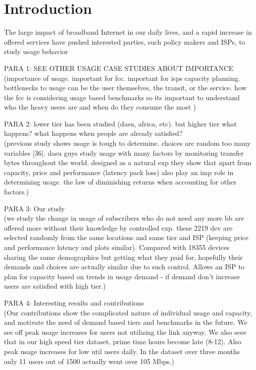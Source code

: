 \section{Introduction}\label{sec:introduction}

The large impact of broadband Internet in our daily lives, and a rapid increase 
in offered services have pushed interested parties, such policy makers and 
ISPs, to study usage behavior



PARA 1: SEE OTHER USAGE CASE STUDIES ABOUT IMPORTANCE\\
(importance of usage. important for fcc. important for isps capacity planning. bottlenecks to usage can be the user themselves, the transit, or the service. how the fcc is considering usage based benchmarks so its important to understand who the heavy users are and when do they consume the most )

PARA 2: lower tier has been studied (dasu, africa, etc). but higher tier what happens? what happens when people are already satisfied?\\
(previous study shows usage is tough to determine. choices are random too many variables [36]. dasu guys study usage with many factors by monitoring transfer bytes throughout the world. designed as a natural exp they show that apart from capacity, price and performance (latency pack loss) also play an imp role in determining usage. the law of diminishing returns when accounting for other factors.)

PARA 3: Our study\\
(we study the change in usage of subscribers who do not need any more bb are offered more without their knowledge by controlled exp. these 2219 dev are selected randomly from the same locations and same tier and ISP (keeping price and performance latency and plots similar). Compared with 18355 devices sharing the same demographics but getting what they paid for, hopefully their demands and choices are actually similar due to such control. Allows an ISP to plan for capacity based on trends in usage demand - if demand don't increase users are satisfied with high tier.)

PARA 4: Interesting results and contributions\\
(Our contributions show the complicated nature of individual usage and capacity, and motivate the need of demand based tiers and benchmarks in the future. We see off peak usage increases for users not utilizing the link anyway. We also seee that in our high speed tier dataset, prime time hours become late (8-12). Also peak usage increases for low util users daily. In the dataset over three months only 11 users out of 1500 actually went over 105 Mbps.) 

